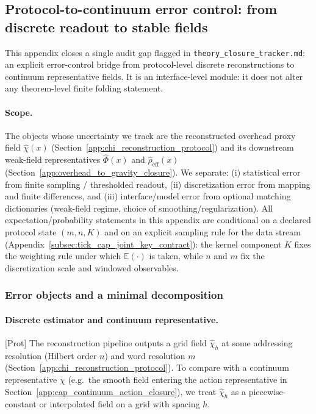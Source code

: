 \subsection{Protocol-to-continuum error control: from discrete readout to stable fields}
\label{app:protocol_to_continuum_error_control}

This appendix closes a single audit gap flagged in \texttt{theory\_closure\_tracker.md}: an explicit error-control bridge from protocol-level discrete reconstructions to continuum representative fields.
It is an interface-level module: it does not alter any theorem-level finite folding statement.

\paragraph{Scope.}
\InterfaceTag The objects whose uncertainty we track are the reconstructed overhead proxy field $\widehat\chi(x)$ (Section~\ref{app:chi_reconstruction_protocol}) and its downstream weak-field representatives $\widehat\Phi(x)$ and $\widehat\rho_{\mathrm{eff}}(x)$ (Section~\ref{app:overhead_to_gravity_closure}).
We separate: (i) statistical error from finite sampling / thresholded readout, (ii) discretization error from mapping and finite differences, and (iii) interface/model error from optional matching dictionaries (weak-field regime, choice of smoothing/regularization).
\AuditTag All expectation/probability statements in this appendix are conditional on a declared protocol state $(m,n,K)$ and on an explicit sampling rule for the data stream (Appendix~\ref{subsec:tick_cap_joint_key_contract}): the kernel component $K$ fixes the weighting rule under which $\mathbb{E}(\cdot)$ is taken, while $n$ and $m$ fix the discretization scale and windowed observables.

\subsubsection{Error objects and a minimal decomposition}
\label{subsec:prot_to_cont_error_objects}

\paragraph{Discrete estimator and continuum representative.}
\textsf{\footnotesize[Prot]} The reconstruction pipeline outputs a grid field $\widehat\chi_h$ at some addressing resolution (Hilbert order $n$) and word resolution $m$ (Section~\ref{app:chi_reconstruction_protocol}).
To compare with a continuum representative $\chi$ (e.g.\ the smooth field entering the action representative in Section~\ref{app:cap_continuum_action_closure}), we treat $\widehat\chi_h$ as a piecewise-constant or interpolated field on a grid with spacing $h$.

